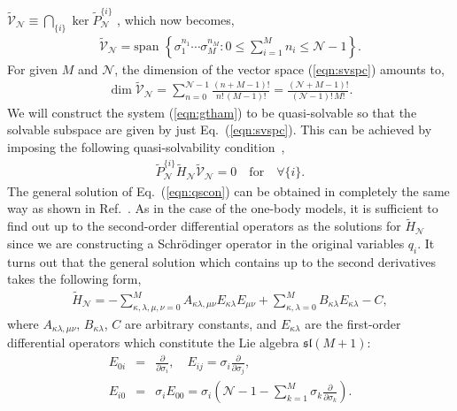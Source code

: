 \documentclass[a4paper,preprint,amsfonts,amssymb,amsmath,%
tightenlines,nofootinbib,noshowpacs]{revtex4}
\newcommand{\cN}{\mathcal{N}}
\newcommand{\cV}{\mathcal{V}}
\newcommand{\Lsl}{\mathfrak{sl}}
\begin{document}
$\tilde{\cV}_{\cN}\equiv\bigcap_{\{i\}}\ker \tilde{P}_{\cN}^{\{i\}}$
, which now becomes,
\begin{eqnarray}
\tilde{\cV}_{\cN}
=\text{span }\left\{\sigma_{1}^{n_{1}}\cdots\sigma_{M}^{n_{M}}:
0\le\textstyle{\sum_{i=1}^{M}}n_{i}\le\cN -1\right\}.
\label{eqn:svspc}
\end{eqnarray}
For given $M$ and $\cN$, the dimension of the vector space
(\ref{eqn:svspc}) amounts to,
\begin{eqnarray}
\dim \tilde{\cV}_{\cN}=\sum_{n=0}^{\cN -1}\frac{(n+M-1)!}{n!\, (M-1)!}
=\frac{(\cN +M-1)!}{(\cN -1)!\, M!}.
\label{eqn:dimvs}
\end{eqnarray}
We will construct the system (\ref{eqn:gtham}) to be quasi-solvable
so that the solvable subspace are given by just
Eq.~(\ref{eqn:svspc}). This can be achieved by imposing the
following quasi-solvability condition~\cite{AST2,ANST1},
\begin{eqnarray}
\tilde{P}_{\cN}^{\{i\}}\tilde{H}_{\cN}\tilde{\cV}_{\cN}=0
\quad\text{for}\quad \forall\{i\}.
\label{eqn:qscon}
\end{eqnarray}
The general solution of Eq.~(\ref{eqn:qscon}) can be obtained in
completely the same way as shown in Ref.~\cite{ANST1}. As in the
 case of the one-body models, it is sufficient to
find out up to the second-order differential operators as
the solutions for $\tilde{H}_{\cN}$ since we are constructing
a Schr\"{o}dinger operator in the original variables $q_{i}$.
It turns out that the general solution which contains up to the
second derivatives takes the following form,
\begin{eqnarray}
\tilde{H}_{\cN}=-
\!\!\!
\sum_{\kappa,\lambda,\mu,\nu=0}^{M}
\!\!\!
A_{\kappa\lambda,\mu\nu}E_{\kappa\lambda}E_{\mu\nu}
+\sum_{\kappa,\lambda=0}^{M}B_{\kappa\lambda}E_{\kappa\lambda}
-C,
\label{eqn:gsham}
\end{eqnarray}
where $A_{\kappa\lambda,\mu\nu}$, $B_{\kappa\lambda}$, $C$ are
arbitrary constants, and $E_{\kappa\lambda}$ are the first-order
differential operators which constitute the Lie algebra $\Lsl(M+1)$:
\begin{subequations}
\label{eqns:gensl}
\begin{eqnarray}
E_{0i}&=&\frac{\partial}{\partial\sigma_{i}},\quad
E_{ij}=\sigma_{i}\frac{\partial}{\partial\sigma_{j}},
\label{eqn:gensl1}\\
E_{i0}&=&\sigma_{i} E_{00}=\sigma_{i}\left(\cN -1-\sum_{k=1}^{M}
\sigma_{k}\frac{\partial}{\partial\sigma_{k}}\right).
\label{eqn:gensl2}
\end{eqnarray}
\end{subequations}
\end{document}
